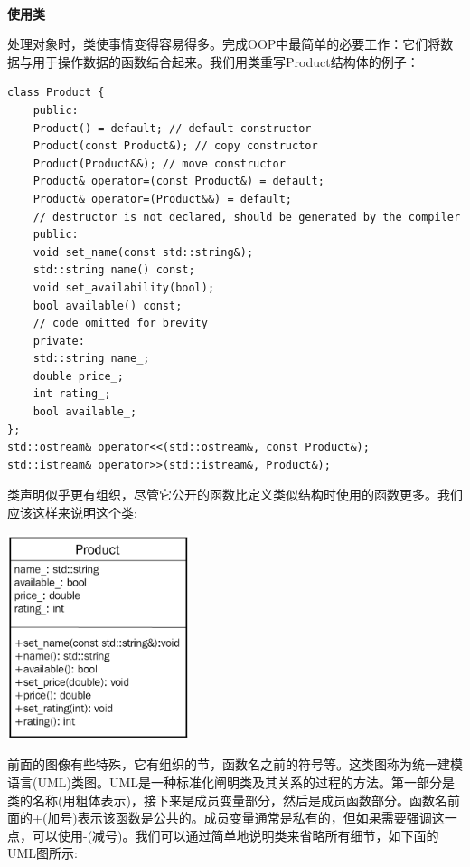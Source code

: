 \noindent\textbf{}\ \par
\textbf{使用类} \ \par
处理对象时，类使事情变得容易得多。完成OOP中最简单的必要工作：它们将数据与用于操作数据的函数结合起来。我们用类重写Product结构体的例子： \par

\begin{lstlisting}[caption={}]
class Product {
	public:
	Product() = default; // default constructor
	Product(const Product&); // copy constructor
	Product(Product&&); // move constructor
	Product& operator=(const Product&) = default;
	Product& operator=(Product&&) = default;
	// destructor is not declared, should be generated by the compiler
	public:
	void set_name(const std::string&);
	std::string name() const;
	void set_availability(bool);
	bool available() const;
	// code omitted for brevity
	private:
	std::string name_;
	double price_;
	int rating_;
	bool available_;
};
std::ostream& operator<<(std::ostream&, const Product&);
std::istream& operator>>(std::istream&, Product&);
\end{lstlisting}

类声明似乎更有组织，尽管它公开的函数比定义类似结构时使用的函数更多。我们应该这样来说明这个类: \par

\begin{center}
	\includegraphics[width=0.4\textwidth]{content/Section-1/Chapter-3/5}
\end{center}

前面的图像有些特殊，它有组织的节，函数名之前的符号等。这类图称为统一建模语言(UML)类图。UML是一种标准化阐明类及其关系的过程的方法。第一部分是类的名称(用粗体表示)，接下来是成员变量部分，然后是成员函数部分。函数名前面的+(加号)表示该函数是公共的。成员变量通常是私有的，但如果需要强调这一点，可以使用-(减号)。我们可以通过简单地说明类来省略所有细节，如下面的UML图所示: \par

